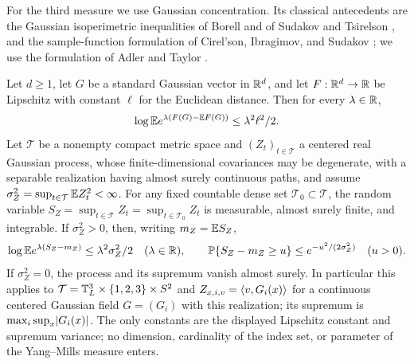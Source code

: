 For the third measure we use Gaussian concentration. Its classical antecedents are the Gaussian isoperimetric inequalities of Borell \cite{Borell1975GaussianIsoperimetry} and of Sudakov and Tsirelson \cite{SudakovTsirelson1974GaussianIsoperimetry}, and the sample-function formulation of Cirel'son, Ibragimov, and Sudakov \cite{CirelsonIbragimovSudakov1976}; we use the formulation of Adler and Taylor \cite{AdlerTaylor2007}.

\begin{lemma}\label{ch31:lem:gaussian-supremum}
Let $d\ge1$, let $G$ be a standard Gaussian vector in $\mathbb R^d$, and let $F:\mathbb R^d\to\mathbb R$ be Lipschitz with constant $\ell$ for the Euclidean distance. Then for every $\lambda\in\mathbb R$,
\[
 \log\mathbb E e^{\lambda(F(G)-\mathbb E F(G))}\le\lambda^2\ell^2/2.
\]
Let $\mathcal T$ be a nonempty compact metric space and $(Z_t)_{t\in\mathcal T}$ a centered real Gaussian process, whose finite-dimensional covariances may be degenerate, with a separable realization having almost surely continuous paths, and assume $\sigma_Z^2=\sup_{t\in\mathcal T}\mathbb E Z_t^2<\infty$. For any fixed countable dense set $\mathcal T_0\subset\mathcal T$, the random variable $S_Z=\sup_{t\in\mathcal T}Z_t=\sup_{t\in\mathcal T_0}Z_t$ is measurable, almost surely finite, and integrable. If $\sigma_Z^2>0$, then, writing $m_Z=\mathbb E S_Z$,
\[
 \log\mathbb E e^{\lambda(S_Z-m_Z)}\le\lambda^2\sigma_Z^2/2\quad(\lambda\in\mathbb R),\qquad
 \mathbb P\{S_Z-m_Z\ge u\}\le e^{-u^2/(2\sigma_Z^2)}\quad(u>0).
\]
If $\sigma_Z^2=0$, the process and its supremum vanish almost surely. In particular this applies to $\mathcal T=\mathbb T_L^3\times\{1,2,3\}\times S^2$ and $Z_{x,i,v}=\langle v,G_i(x)\rangle$ for a continuous centered Gaussian field $G=(G_i)$ with this realization; its supremum is $\max_i\sup_x\lvert G_i(x)\rvert$. The only constants are the displayed Lipschitz constant and supremum variance; no dimension, cardinality of the index set, or parameter of the Yang--Mills measure enters.
\end{lemma}

